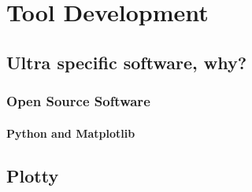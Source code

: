 \documentclass[../Master.tex]{subfiles}
\begin{document}
\chapter{Tool Development}\label{chap:tooldev}

\section{Ultra specific software, why?}\label{sec:specific-software}

\subsection{Open Source Software}\label{sec:open-source-software}

\subsubsection{Python and Matplotlib}\label{sec:py-plt}

\section{Plotty}\label{sec:plotty}
\end{document}
